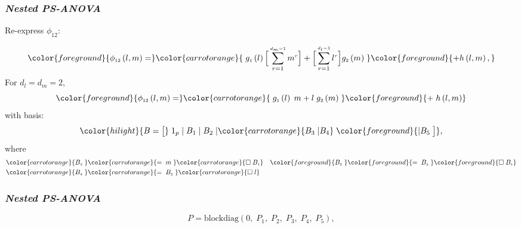 \documentclass[12pt]{beamer}
\newcommand{\newmaththought}[1]{{ \color{foreground} {#1}}}
\newcommand{\carrotorangemath}[1]{{ \color{carrotorange} {#1}}}
\newcommand{\ms}{\scriptscriptstyle}
\begin{document}
\begin{frame}
\frametitle{\emph{Nested PS-ANOVA}}

Re-express $\phi_{\ms{12}}$:

\begin{align*}
\newmaththought{ \phi_{\ms{12}}\left(l,m\right)  =} \carrotorangemath{\; g_{\ms 1}\left(l\right) \Big[ \sum_{r=1}^{\ms{d_m-1}} m^{\ms r}\Big] + \Big[ \sum_{r=1}^{\ms{d_l-1}} l^{\ms r} \Big] g_{\ms 2}\left(m\right)\;}  \newmaththought{+ h\left( l,m \right), } 
\end{align*}
\noindent
For $d_l = d_m = 2$,
\[
\newmaththought{ \phi_{\ms{12}}\left(l,m\right)  =} \carrotorangemath{\; g_{\ms 1}\left(l\right) \; m+ l \; g_{\ms 2}\left(m\right)\;}\newmaththought{ + \; h\left( l,m \right) } 
\]
with basis:
\begin{equation} \label{eq:nested-SANOVA-basis-matrix}
\color{hilight}{B = \big[ } \; 1_p \; \vert \;  B_1  \; \vert \;   B_2 \; \vert \carrotorangemath{ B_3 \; \vert B_4 }\;\newmaththought{ \vert B_5 \; \big]},
\end{equation}
\noindent
where
\begin{align*}
\carrotorangemath{B_{\ms 3}\;} &\carrotorangemath{= \;m \;} \carrotorangemath{ \square \;  B_{\ms 1}}  &  \newmaththought{B_{\ms 5}\;}\newmaththought{=\; B_{\ms 2} \;} \newmaththought{ \square \; B_{\ms 1} } \\
 \carrotorangemath{B_{\ms 4}\;}&\carrotorangemath{=\; B_{\ms 2} \;} \carrotorangemath{ \square \; l } &
\end{align*}


\end{frame}




\begin{frame}
\frametitle{\emph{Nested PS-ANOVA}}

\begin{equation} \label{eq:PSANOVA-penalty}
P = \mbox{blockdiag}\left(0,\; P_1, \; P_2, \; P_{3},\; P_4, \; P_{5} \right),
\end{equation}


\end{frame}
\end{document}
